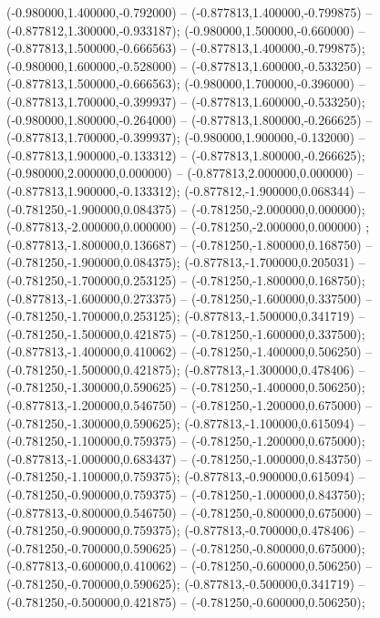  (-0.980000,1.400000,-0.792000) -- (-0.877813,1.400000,-0.799875) -- (-0.877812,1.300000,-0.933187);
 (-0.980000,1.500000,-0.660000) -- (-0.877813,1.500000,-0.666563) -- (-0.877813,1.400000,-0.799875);
 (-0.980000,1.600000,-0.528000) -- (-0.877813,1.600000,-0.533250) -- (-0.877813,1.500000,-0.666563);
 (-0.980000,1.700000,-0.396000) -- (-0.877813,1.700000,-0.399937) -- (-0.877813,1.600000,-0.533250);
 (-0.980000,1.800000,-0.264000) -- (-0.877813,1.800000,-0.266625) -- (-0.877813,1.700000,-0.399937);
 (-0.980000,1.900000,-0.132000) -- (-0.877813,1.900000,-0.133312) -- (-0.877813,1.800000,-0.266625);
 (-0.980000,2.000000,0.000000) -- (-0.877813,2.000000,0.000000) -- (-0.877813,1.900000,-0.133312);
 (-0.877812,-1.900000,0.068344) -- (-0.781250,-1.900000,0.084375) -- (-0.781250,-2.000000,0.000000);
 (-0.877813,-2.000000,0.000000) -- (-0.781250,-2.000000,0.000000) ;
 (-0.877813,-1.800000,0.136687) -- (-0.781250,-1.800000,0.168750) -- (-0.781250,-1.900000,0.084375);
 (-0.877813,-1.700000,0.205031) -- (-0.781250,-1.700000,0.253125) -- (-0.781250,-1.800000,0.168750);
 (-0.877813,-1.600000,0.273375) -- (-0.781250,-1.600000,0.337500) -- (-0.781250,-1.700000,0.253125);
 (-0.877813,-1.500000,0.341719) -- (-0.781250,-1.500000,0.421875) -- (-0.781250,-1.600000,0.337500);
 (-0.877813,-1.400000,0.410062) -- (-0.781250,-1.400000,0.506250) -- (-0.781250,-1.500000,0.421875);
 (-0.877813,-1.300000,0.478406) -- (-0.781250,-1.300000,0.590625) -- (-0.781250,-1.400000,0.506250);
 (-0.877813,-1.200000,0.546750) -- (-0.781250,-1.200000,0.675000) -- (-0.781250,-1.300000,0.590625);
 (-0.877813,-1.100000,0.615094) -- (-0.781250,-1.100000,0.759375) -- (-0.781250,-1.200000,0.675000);
 (-0.877813,-1.000000,0.683437) -- (-0.781250,-1.000000,0.843750) -- (-0.781250,-1.100000,0.759375);
 (-0.877813,-0.900000,0.615094) -- (-0.781250,-0.900000,0.759375) -- (-0.781250,-1.000000,0.843750);
 (-0.877813,-0.800000,0.546750) -- (-0.781250,-0.800000,0.675000) -- (-0.781250,-0.900000,0.759375);
 (-0.877813,-0.700000,0.478406) -- (-0.781250,-0.700000,0.590625) -- (-0.781250,-0.800000,0.675000);
 (-0.877813,-0.600000,0.410062) -- (-0.781250,-0.600000,0.506250) -- (-0.781250,-0.700000,0.590625);
 (-0.877813,-0.500000,0.341719) -- (-0.781250,-0.500000,0.421875) -- (-0.781250,-0.600000,0.506250);
